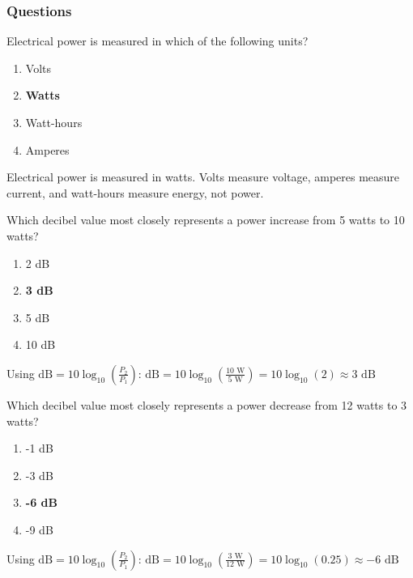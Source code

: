 \subsubsection*{Questions}
\begin{tcolorbox}[colback=gray!10!white,colframe=black!75!black,title={T5A02}]
Electrical power is measured in which of the following units?
\begin{enumerate}[label=\Alph*),noitemsep]
    \item Volts
    \item \textbf{Watts}
    \item Watt-hours
    \item Amperes
\end{enumerate}
\end{tcolorbox}
Electrical power is measured in watts. Volts measure voltage, amperes measure current, and watt-hours measure energy, not power.

\begin{tcolorbox}[colback=gray!10!white,colframe=black!75!black,title={T5B09}]
Which decibel value most closely represents a power increase from 5 watts to 10 watts?
\begin{enumerate}[label=\Alph*),noitemsep]
    \item 2 dB
    \item \textbf{3 dB}
    \item 5 dB
    \item 10 dB
\end{enumerate}
\end{tcolorbox}

Using $\text{dB} = 10 \log_{10}(\frac{P_2}{P_1})$:
$\text{dB} = 10 \log_{10}(\frac{10\text{ W}}{5\text{ W}}) = 10 \log_{10}(2) \approx 3\text{ dB}$

\begin{tcolorbox}[colback=gray!10!white,colframe=black!75!black,title={T5B10}]
Which decibel value most closely represents a power decrease from 12 watts to 3 watts?
\begin{enumerate}[label=\Alph*),noitemsep]
    \item -1 dB
    \item -3 dB
    \item \textbf{-6 dB}
    \item -9 dB
\end{enumerate}
\end{tcolorbox}

Using $\text{dB} = 10 \log_{10}(\frac{P_2}{P_1})$:
$\text{dB} = 10 \log_{10}(\frac{3\text{ W}}{12\text{ W}}) = 10 \log_{10}(0.25) \approx -6\text{ dB}$

